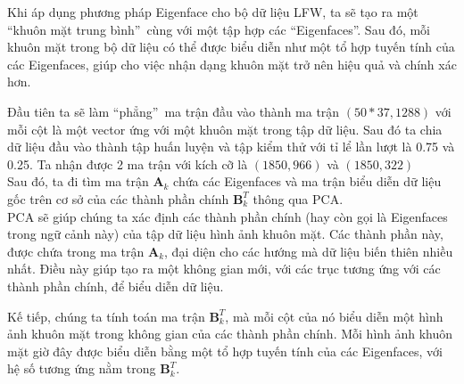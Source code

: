 \documentclass[12pt,a4paper,oneside]{report}
\numberwithin{equation}{section}
\begin{document}
Khi áp dụng phương pháp Eigenface cho bộ dữ liệu LFW, ta sẽ tạo ra một \textquotedblleft khuôn mặt trung bình\textquotedblright\ cùng với một tập hợp các \textquotedblleft Eigenfaces\textquotedblright. Sau đó, mỗi khuôn mặt trong bộ dữ liệu có thể được biểu diễn như một tổ hợp tuyến tính của các Eigenfaces, giúp cho việc nhận dạng khuôn mặt trở nên hiệu quả và chính xác hơn.

Đầu tiên ta sẽ làm \textquotedblleft phẳng\textquotedblright\ ma trận đầu vào thành ma trận $(50*37,1288)$ với mỗi cột là một vector ứng với một khuôn mặt trong tập dữ liệu. Sau đó ta chia dữ liệu đầu vào thành tập huấn luyện và tập kiểm thử với tỉ lể lần lượt là 0.75 và 0.25. Ta nhận được 2 ma trận với kích cỡ là $(1850,966)$ và $(1850,322)$\\
Sau đó, ta đi tìm ma trận $\mathbf{A}_k$ chứa các Eigenfaces và ma trận biểu diễn dữ liệu gốc trên cơ sở của các thành phần chính $\mathbf{B}_k^T$ thông qua PCA.\\
PCA sẽ giúp chúng ta xác định các thành phần chính (hay còn gọi là Eigenfaces trong ngữ cảnh này) của tập dữ liệu hình ảnh khuôn mặt. Các thành phần này, được chứa trong ma trận $\mathbf{A}_k$, đại diện cho các hướng mà dữ liệu biến thiên nhiều nhất. Điều này giúp tạo ra một không gian mới, với các trục tương ứng với các thành phần chính, để biểu diễn dữ liệu.

Kế tiếp, chúng ta tính toán ma trận $\mathbf{B}_k^T$, mà mỗi cột của nó biểu diễn một hình ảnh khuôn mặt trong không gian của các thành phần chính. Mỗi hình ảnh khuôn mặt giờ đây được biểu diễn bằng một tổ hợp tuyến tính của các Eigenfaces, với hệ số tương ứng nằm trong $\mathbf{B}_k^T$.
\end{document}
